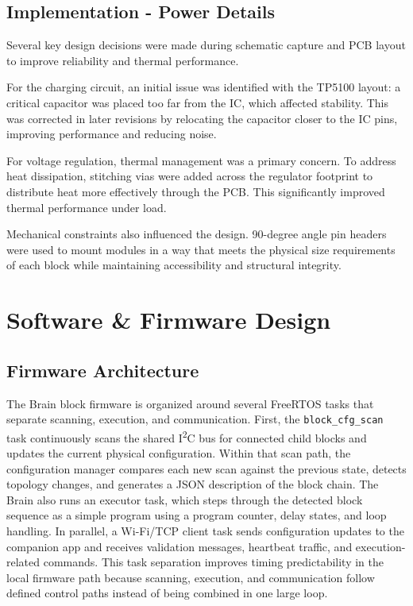 \documentclass[10pt, conference]{IEEEtran}
\begin{document}
\subsection{Implementation - Power Details}
Several key design decisions were made during schematic capture and PCB layout to improve reliability and thermal performance.

For the charging circuit, an initial issue was identified with the TP5100 layout: a critical capacitor was placed too far from the IC, which affected stability. This was corrected in later revisions by relocating the capacitor closer to the IC pins, improving performance and reducing noise.

For voltage regulation, thermal management was a primary concern. To address heat dissipation, stitching vias were added across the regulator footprint to distribute heat more effectively through the PCB. This significantly improved thermal performance under load.

Mechanical constraints also influenced the design. 90-degree angle pin headers were used to mount modules in a way that meets the physical size requirements of each block while maintaining accessibility and structural integrity.

\section{Software \& Firmware Design}

\subsection{Firmware Architecture}
The Brain block firmware is organized around several FreeRTOS tasks that separate scanning, execution, and communication. First, the \texttt{block\_cfg\_scan} task continuously scans the shared I\textsuperscript{2}C bus for connected child blocks and updates the current physical configuration. Within that scan path, the configuration manager compares each new scan against the previous state, detects topology changes, and generates a JSON description of the block chain. The Brain also runs an executor task, which steps through the detected block sequence as a simple program using a program counter, delay states, and loop handling. In parallel, a Wi-Fi/TCP client task sends configuration updates to the companion app and 
receives validation messages, heartbeat traffic, and execution-related commands. This task separation improves timing predictability in the local firmware path because scanning, execution, and communication follow defined control paths instead of being combined in one large loop. 
\end{document}
